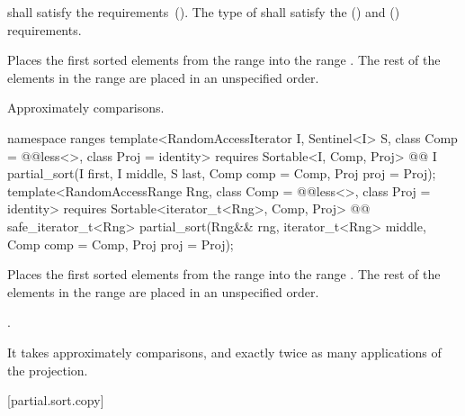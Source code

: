 \begin{itemdescr}
\pnum
\requires
{} shall satisfy the
 requirements~(). The type
of  shall satisfy the
 () and
 () requirements.

\pnum
\effects
Places the first
sorted elements from the range
into the range
.
The rest of the elements in the range
are placed in an unspecified order.
%

\pnum
\complexity
Approximately
comparisons.
\end{itemdescr}

\begin{addedblock}
%
\begin{itemdecl}
namespace ranges {
  template<RandomAccessIterator I, Sentinel<I> S, class Comp = @@less<>,
      class Proj = identity>
    requires Sortable<I, Comp, Proj>
    @@ I
      partial_sort(I first, I middle, S last, Comp comp = Comp{}, Proj proj = Proj{});
  template<RandomAccessRange Rng, class Comp = @@less<>, class Proj = identity>
    requires Sortable<iterator_t<Rng>, Comp, Proj>
    @@ safe_iterator_t<Rng>
      partial_sort(Rng&& rng, iterator_t<Rng> middle, Comp comp = Comp{},
                   Proj proj = Proj{});
}
\end{itemdecl}

\begin{itemdescr}
\pnum
\effects
Places the first
sorted elements from the range
into the range
.
The rest of the elements in the range
are placed in an unspecified order.
%

\pnum
\returns {}.

\pnum
\complexity
It takes approximately
comparisons, and exactly twice as many applications of the projection.
\end{itemdescr}
\end{addedblock}

[partial.sort.copy]{}

